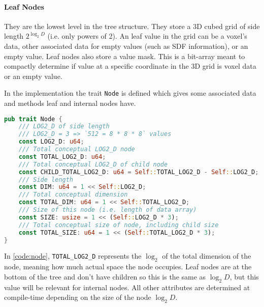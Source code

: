 \paragraph{Leaf Nodes} They are the lowest level in the tree structure. They store a 3D cubed grid of side length $2^{\log_{2} D}$ (i.e. only powers of 2). An leaf value in the grid can be a voxel's data, other associated data for empty values (such as SDF information), or an empty value.
Leaf nodes also store a value mask. This is a bit-array meant to compactly determine if value at a specific coordinate in the 3D grid is voxel data or an empty value.

In the implementation the trait \verb|Node| is defined which gives some associated data and methods leaf and internal nodes have.

\begin{lstlisting}[language=rust,caption={\texttt{Node} trait definition},captionpos=b,label={code:node}]
pub trait Node {
    /// LOG2_D of side length
    /// LOG2_D = 3 => `512 = 8 * 8 * 8` values
    const LOG2_D: u64;
    /// Total conceptual LOG2_D node
    const TOTAL_LOG2_D: u64;
    /// Total conceptual LOG2_D of child node
    const CHILD_TOTAL_LOG2_D: u64 = Self::TOTAL_LOG2_D - Self::LOG2_D;
    /// Side length
    const DIM: u64 = 1 << Self::LOG2_D;
    /// Total conceptual dimension
    const TOTAL_DIM: u64 = 1 << Self::TOTAL_LOG2_D;
    /// Size of this node (i.e. length of data array)
    const SIZE: usize = 1 << (Self::LOG2_D * 3);
    /// Total conceptual size of node, including child size
    const TOTAL_SIZE: u64 = 1 << (Self::TOTAL_LOG2_D * 3);
}
\end{lstlisting}

In \cref{code:node}, \verb|TOTAL_LOG2_D| represents the $\log_{2}$ of the total dimension of the node, meaning how much actual space the node occupies. Leaf nodes are at the bottom of the tree and don't have children so this is the same as $\log_{2} D$, but this value will be relevant for internal nodes. All other attributes are determined at compile-time depending on the size of the node $\log_{2} D$.

